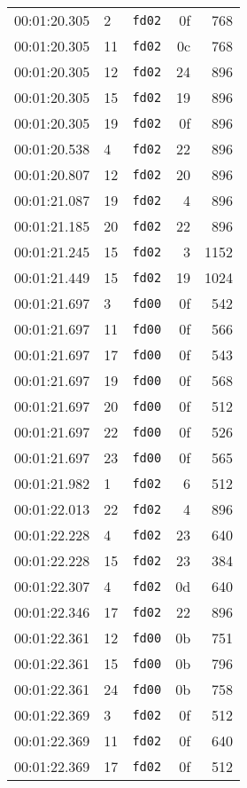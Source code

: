 \documentclass{article}
\begin{document}
\begin{longtable}{lllrr}
00:01:20.305 & 2 & \texttt{fd02} & 0f & 768 \\
00:01:20.305 & 11 & \texttt{fd02} & 0c & 768 \\
00:01:20.305 & 12 & \texttt{fd02} & 24 & 896 \\
00:01:20.305 & 15 & \texttt{fd02} & 19 & 896 \\
00:01:20.305 & 19 & \texttt{fd02} & 0f & 896 \\
00:01:20.538 & 4 & \texttt{fd02} & 22 & 896 \\
00:01:20.807 & 12 & \texttt{fd02} & 20 & 896 \\
00:01:21.087 & 19 & \texttt{fd02} & 4 & 896 \\
00:01:21.185 & 20 & \texttt{fd02} & 22 & 896 \\
00:01:21.245 & 15 & \texttt{fd02} & 3 & 1152 \\
00:01:21.449 & 15 & \texttt{fd02} & 19 & 1024 \\
00:01:21.697 & 3 & \texttt{fd00} & 0f & 542 \\
00:01:21.697 & 11 & \texttt{fd00} & 0f & 566 \\
00:01:21.697 & 17 & \texttt{fd00} & 0f & 543 \\
00:01:21.697 & 19 & \texttt{fd00} & 0f & 568 \\
00:01:21.697 & 20 & \texttt{fd00} & 0f & 512 \\
00:01:21.697 & 22 & \texttt{fd00} & 0f & 526 \\
00:01:21.697 & 23 & \texttt{fd00} & 0f & 565 \\
00:01:21.982 & 1 & \texttt{fd02} & 6 & 512 \\
00:01:22.013 & 22 & \texttt{fd02} & 4 & 896 \\
00:01:22.228 & 4 & \texttt{fd02} & 23 & 640 \\
00:01:22.228 & 15 & \texttt{fd02} & 23 & 384 \\
00:01:22.307 & 4 & \texttt{fd02} & 0d & 640 \\
00:01:22.346 & 17 & \texttt{fd02} & 22 & 896 \\
00:01:22.361 & 12 & \texttt{fd00} & 0b & 751 \\
00:01:22.361 & 15 & \texttt{fd00} & 0b & 796 \\
00:01:22.361 & 24 & \texttt{fd00} & 0b & 758 \\
00:01:22.369 & 3 & \texttt{fd02} & 0f & 512 \\
00:01:22.369 & 11 & \texttt{fd02} & 0f & 640 \\
00:01:22.369 & 17 & \texttt{fd02} & 0f & 512 \\

\end{longtable}
\end{document}
